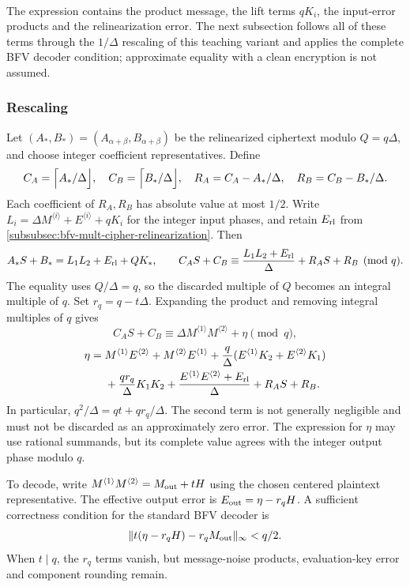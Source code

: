 $ $

The expression contains the product message, the lift terms $qK_i$, the input-error products and the relinearization error. The next subsection follows all of these terms through the $1/\Delta$ rescaling of this teaching variant and applies the complete BFV decoder condition; approximate equality with a clean encryption is not assumed.


\subsubsection{Rescaling}
\label{subsubsec:bfv-mult-cipher-rescaling}

Let $(A_*,B_*)=(A_{\alpha+\beta},B_{\alpha+\beta})$ be the relinearized ciphertext modulo $Q=q\Delta$, and choose integer coefficient representatives. Define
\[
C_A=\Bigl\lceil A_*/\Delta\Bigr\rfloor,\quad C_B=\Bigl\lceil B_*/\Delta\Bigr\rfloor,
\quad R_A=C_A-A_*/\Delta,\quad R_B=C_B-B_*/\Delta.
\]
Each coefficient of $R_A,R_B$ has absolute value at most $1/2$. Write $L_i=\Delta M^{\langle i\rangle}+E^{\langle i\rangle}+qK_i$ for the integer input phases, and retain $E_{\rm rl}$ from \autoref{subsubsec:bfv-mult-cipher-relinearization}. Then
\[
A_*S+B_*=L_1L_2+E_{\rm rl}+QK_*,
\qquad C_AS+C_B\equiv\frac{L_1L_2+E_{\rm rl}}{\Delta}+R_AS+R_B\pmod q.
\]
The equality uses $Q/\Delta=q$, so the discarded multiple of $Q$ becomes an integral multiple of $q$. Set $r_q=q-t\Delta$. Expanding the product and removing integral multiples of $q$ gives
\[
C_AS+C_B\equiv\Delta M^{\langle1\rangle}M^{\langle2\rangle}+\eta\pmod q,
\]
\[
\begin{split}
\eta={}&M^{\langle1\rangle}E^{\langle2\rangle}+M^{\langle2\rangle}E^{\langle1\rangle}
+\frac q\Delta(E^{\langle1\rangle}K_2+E^{\langle2\rangle}K_1)\\
&+\frac{q r_q}{\Delta}K_1K_2
+\frac{E^{\langle1\rangle}E^{\langle2\rangle}+E_{\rm rl}}{\Delta}+R_AS+R_B.
\end{split}
\]
In particular, $q^2/\Delta=qt+q r_q/\Delta$. The second term is not generally negligible and must not be discarded as an approximately zero error. The expression for $\eta$ may use rational summands, but its complete value agrees with the integer output phase modulo $q$.

To decode, write $M^{\langle1\rangle}M^{\langle2\rangle}=M_{\rm out}+tH$ using the chosen centered plaintext representative. The effective output error is $E_{\rm out}=\eta-r_qH$. A sufficient correctness condition for the standard BFV decoder is
\[
\|t(\eta-r_qH)-r_qM_{\rm out}\|_\infty<q/2.
\]
When $t\mid q$, the $r_q$ terms vanish, but message-noise products, evaluation-key error and component rounding remain.

